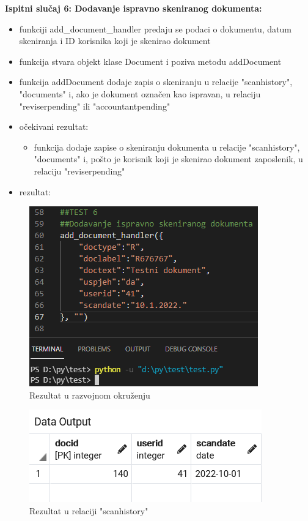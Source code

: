 		\textbf{Ispitni slučaj 6: Dodavanje ispravno skeniranog dokumenta:}\\
\begin{itemize}
	\item funkciji add\_document\_handler predaju se podaci o dokumentu, datum skeniranja i ID korisnika koji je skenirao dokument
	\item funkcija stvara objekt klase Document i poziva metodu addDocument
	\item funkcija addDocument dodaje zapis o skeniranju u relacije "scanhistory", "documents" i, ako je dokument označen kao ispravan, u relaciju "reviserpending" ili "accountantpending" 
	
	\item očekivani rezultat:\\
	\begin{itemize}
		\item funkcija dodaje zapise o skeniranju dokumenta u relacije "scanhistory", "documents" i, pošto je korisnik koji je skenirao dokument zaposlenik, u relaciju "reviserpending"
	\end{itemize}
	\item rezultat:
\end{itemize}
\begin{figure}[H]
	\centering
	\includegraphics[scale=0.5]{./slike/rez6.png}
	\caption{Rezultat u razvojnom okruženju}
	\label{fig:REZ6}
\end{figure}
\begin{figure}[H]
	\centering
	\includegraphics[scale=0.5]{./slike/baza6sh.png}
	\caption{Rezultat u relaciji "scanhistory"}
	\label{fig:BAZA6a}
\end{figure}

